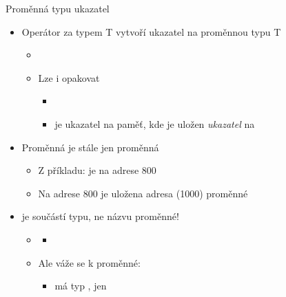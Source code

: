 \begin{frame}{Proměnná typu ukazatel}

  \begin{itemize}
    \item Operátor \code{*} za typem T vytvoří ukazatel na proměnnou typu T
    \begin{itemize}
      \item {}


      \pause

      \item Lze i opakovat
      \begin{itemize}
	\item {}
	\item {} je ukazatel na paměť, kde je uložen \emph{ukazatel} na
      \end{itemize}
    \end{itemize}

    \pause

    \item Proměnná  je stále jen proměnná
    \begin{itemize}
      \item Z příkladu:  je na adrese 800
      \item Na adrese 800 je uložena adresa (1000) proměnné 
    \end{itemize}

    \pause

    \item \code{*} je součástí typu, ne názvu proměnné!
    \begin{itemize}
      \item {}
      \begin{itemize}
	\item {}
      \end{itemize}

      \pause

      \item Ale váže se k proměnné: 
      \begin{itemize}
	\item {} má typ ,  jen 
      \end{itemize}
    \end{itemize}

  \end{itemize}

\end{frame}

